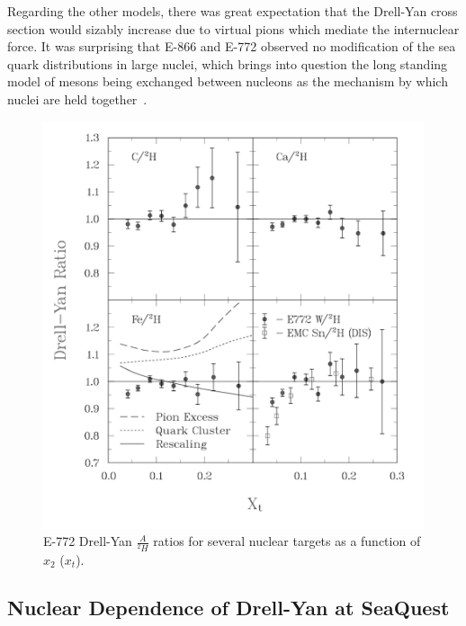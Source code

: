 Regarding the other models, there was great expectation that the Drell-Yan cross section would sizably increase due to virtual pions which mediate the internuclear force. It was surprising that E-866 and E-772 observed no modification of the sea quark distributions in large nuclei, which brings into question the long standing model of mesons being exchanged between nucleons as the mechanism by which nuclei are held together~\cite{Carlson:1997qn}. 


\begin{figure}
	\centering
	\includegraphics[width=\textwidth]{figures/background/dyfig9.png}
	\caption{E-772 Drell-Yan $\frac{A}{^2H}$ ratios for several nuclear targets as a function of $x_2$ ($x_t$)\cite{PhysRevLett.64.2479}.}
	\label{fig:772-dy}
\end{figure}

\subsection{Nuclear Dependence of Drell-Yan at SeaQuest}




